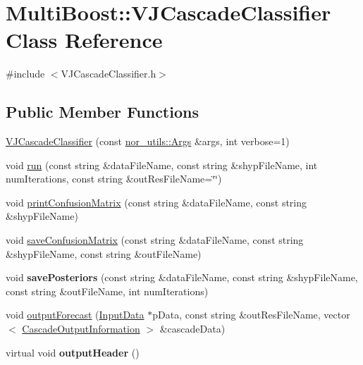 \hypertarget{classMultiBoost_1_1VJCascadeClassifier}{\section{Multi\-Boost\-:\-:V\-J\-Cascade\-Classifier Class Reference}
\label{classMultiBoost_1_1VJCascadeClassifier}
}


{\ttfamily \#include $<$V\-J\-Cascade\-Classifier.\-h$>$}

\subsection*{Public Member Functions}
\begin{DoxyCompactItemize}
\item 
\hyperlink{classMultiBoost_1_1VJCascadeClassifier_a222c036df7f9becf6796558826c19bdc}{V\-J\-Cascade\-Classifier} (const \hyperlink{classnor__utils_1_1Args}{nor\-\_\-utils\-::\-Args} \&args, int verbose=1)
\item 
void \hyperlink{classMultiBoost_1_1VJCascadeClassifier_af77b98a8c5a132f4a53f68d0a53ce2c8}{run} (const string \&data\-File\-Name, const string \&shyp\-File\-Name, int num\-Iterations, const string \&out\-Res\-File\-Name=\char`\"{}\char`\"{})
\item 
void \hyperlink{classMultiBoost_1_1VJCascadeClassifier_a4635aabf0cdfd2c536d2a89c0fd694b2}{print\-Confusion\-Matrix} (const string \&data\-File\-Name, const string \&shyp\-File\-Name)
\item 
void \hyperlink{classMultiBoost_1_1VJCascadeClassifier_a5bc2f2a0449709a27c65e930c4e85677}{save\-Confusion\-Matrix} (const string \&data\-File\-Name, const string \&shyp\-File\-Name, const string \&out\-File\-Name)
\item 
\hypertarget{classMultiBoost_1_1VJCascadeClassifier_af8a56fdf9882d3685e8439c9789a5f07}{void {\bfseries save\-Posteriors} (const string \&data\-File\-Name, const string \&shyp\-File\-Name, const string \&out\-File\-Name, int num\-Iterations)}\label{classMultiBoost_1_1VJCascadeClassifier_af8a56fdf9882d3685e8439c9789a5f07}

\item 
void \hyperlink{classMultiBoost_1_1VJCascadeClassifier_a6ec7ef43d142f20a22511612356c4d5a}{output\-Forecast} (\hyperlink{classMultiBoost_1_1InputData}{Input\-Data} $\ast$p\-Data, const string \&out\-Res\-File\-Name, vector$<$ \hyperlink{structMultiBoost_1_1CascadeOutputInformation}{Cascade\-Output\-Information} $>$ \&cascade\-Data)
\item 
\hypertarget{classMultiBoost_1_1VJCascadeClassifier_a6ed3d565dd59a9e953ae1f48fed634f1}{virtual void {\bfseries output\-Header} ()}\label{classMultiBoost_1_1VJCascadeClassifier_a6ed3d565dd59a9e953ae1f48fed634f1}


\end{DoxyCompactItemize}
